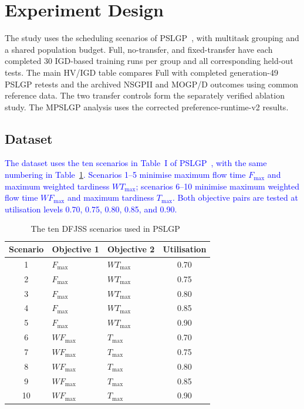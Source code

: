 \documentclass[10pt,journal]{IEEEtran}
\newcommand{\revision}[1]{\textcolor{blue}{#1}}
\newcommand{\resultrevision}[1]{\textcolor{resultrevision}{#1}}
\begin{document}
\section{Experiment Design}
\label{sec:experiment-design}
\resultrevision{The study uses the scheduling scenarios of PSLGP~\cite{xu2026pslgp}, with multitask grouping and a shared population budget. Full, no-transfer, and fixed-transfer have each completed 30 IGD-based training runs per group and all corresponding held-out tests. The main HV/IGD table compares Full with completed generation-49 PSLGP retests and the archived NSGPII and MOGP/D outcomes using common reference data. The two transfer controls form the separately verified ablation study. The MPSLGP analysis uses the corrected preference-runtime-v2 results.}

\subsection{Dataset}
\revision{The dataset uses the ten scenarios in Table~I of PSLGP~\cite{xu2026pslgp}, with the same numbering in Table~\ref{tab:pslgp-scenarios}. Scenarios 1--5 minimise maximum flow time $F_{\max}$ and maximum weighted tardiness $WT_{\max}$; scenarios 6--10 minimise maximum weighted flow time $WF_{\max}$ and maximum tardiness $T_{\max}$. Both objective pairs are tested at utilisation levels 0.70, 0.75, 0.80, 0.85, and 0.90.}

\begin{table}[t]
\centering
\caption{The ten DFJSS scenarios used in PSLGP~\cite{xu2026pslgp}}
\label{tab:pslgp-scenarios}
\footnotesize
\begin{tabular}{cllc}
\toprule
Scenario & Objective 1 & Objective 2 & Utilisation \\
\midrule
1 & $F_{\max}$ & $WT_{\max}$ & 0.70 \\
2 & $F_{\max}$ & $WT_{\max}$ & 0.75 \\
3 & $F_{\max}$ & $WT_{\max}$ & 0.80 \\
4 & $F_{\max}$ & $WT_{\max}$ & 0.85 \\
5 & $F_{\max}$ & $WT_{\max}$ & 0.90 \\
\midrule
6 & $WF_{\max}$ & $T_{\max}$ & 0.70 \\
7 & $WF_{\max}$ & $T_{\max}$ & 0.75 \\
8 & $WF_{\max}$ & $T_{\max}$ & 0.80 \\
9 & $WF_{\max}$ & $T_{\max}$ & 0.85 \\
10 & $WF_{\max}$ & $T_{\max}$ & 0.90 \\
\bottomrule
\end{tabular}
\end{table}
\end{document}
